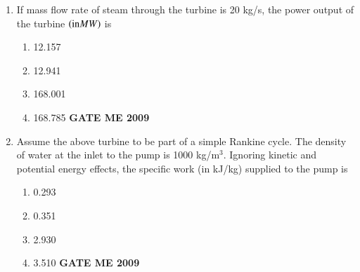 \documentclass[journal]{IEEEtran}
\begin{document}
\begin{enumerate}[leftmargin=0pt]
\item If mass flow rate of steam through the turbine is 20 kg/s, the power output of the turbine $\left(\text{in} MW\right)$ is
\begin{enumerate}[label=(\Alph*)]
  \item 12.157
  \item 12.941
  \item 168.001
  \item 168.785
\hfill{\textbf{GATE ME 2009}}
\end{enumerate}

\item Assume the above turbine to be part of a simple Rankine cycle. The density of water at the inlet to the pump is 1000 kg/m$^3$. Ignoring kinetic and potential energy effects, the specific work (in kJ/kg) supplied to the pump is
\begin{enumerate}[label=(\Alph*)]
  \item 0.293
  \item 0.351
  \item 2.930
  \item 3.510
\hfill{\textbf{GATE ME 2009}}
\end{enumerate}


\end{enumerate}
\end{document}
